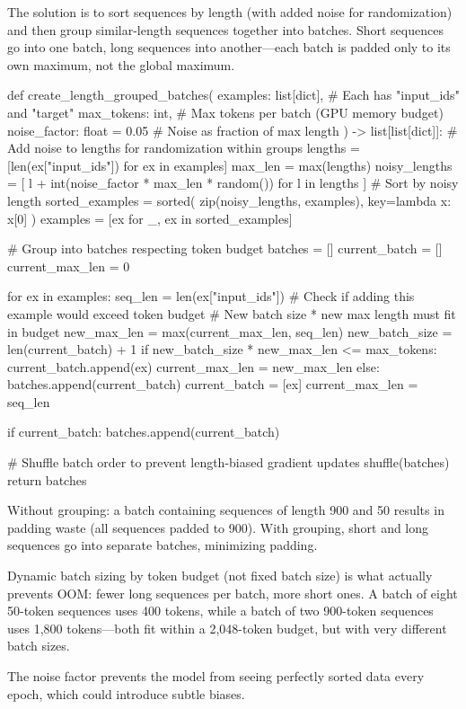 The solution is to sort sequences by length (with added noise for
randomization) and then group similar-length sequences together into
batches. Short sequences go into one batch, long sequences into
another---each batch is padded only to its own maximum, not the global
maximum.

\begin{pseudocode}
def create_length_grouped_batches(
        examples: list[dict],          # Each has "input_ids" and "target"
        max_tokens: int,                # Max tokens per batch (GPU memory budget)
        noise_factor: float = 0.05      # Noise as fraction of max length
    ) -> list[list[dict]]:
    # Add noise to lengths for randomization within groups
    lengths = [len(ex["input_ids"]) for ex in examples]
    max_len = max(lengths)
    noisy_lengths = [
        l + int(noise_factor * max_len * random())
        for l in lengths
    ]
    # Sort by noisy length
    sorted_examples = sorted(
        zip(noisy_lengths, examples), key=lambda x: x[0]
    )
    examples = [ex for _, ex in sorted_examples]

    # Group into batches respecting token budget
    batches = []
    current_batch = []
    current_max_len = 0

    for ex in examples:
        seq_len = len(ex["input_ids"])
        # Check if adding this example would exceed token budget
        # New batch size * new max length must fit in budget
        new_max_len = max(current_max_len, seq_len)
        new_batch_size = len(current_batch) + 1
        if new_batch_size * new_max_len <= max_tokens:
            current_batch.append(ex)
            current_max_len = new_max_len
        else:
            batches.append(current_batch)
            current_batch = [ex]
            current_max_len = seq_len

    if current_batch:
        batches.append(current_batch)

    # Shuffle batch order to prevent length-biased gradient updates
    shuffle(batches)
    return batches
\end{pseudocode}

\begin{keyconcept}
  Without grouping: a batch containing sequences of length 900 and 50
  results in padding waste (all sequences padded to 900). With grouping,
  short and long sequences go into separate batches, minimizing padding.

  Dynamic batch sizing by token budget (not fixed batch size) is what
  actually prevents OOM: fewer long sequences per batch, more short
  ones. A batch of eight 50-token sequences uses 400 tokens, while a
  batch of two 900-token sequences uses 1{,}800 tokens---both fit within
  a 2{,}048-token budget, but with very different batch sizes.

  The noise factor prevents the model from seeing perfectly sorted data
  every epoch, which could introduce subtle biases.
\end{keyconcept}

